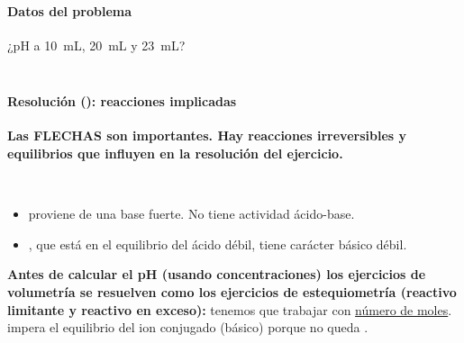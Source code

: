 
\begin{frame}
	\frametitle{\ejerciciocmd}
	\framesubtitle{Datos del problema}
	\begin{center}
		{\huge ¿$\mathrm{pH}$ a \SI{10}{\milli\liter}, \SI{20}{\milli\liter} y \SI{23}{\milli\liter}?}\\[.3cm]
		\\[.3cm]
	\end{center}
\end{frame}

\begin{frame}
	\frametitle{\ejerciciocmd}
	\framesubtitle{Resolución (): reacciones implicadas}
	\alert{\textbf{Las FLECHAS son importantes. Hay reacciones irreversibles y equilibrios que influyen en la resolución del ejercicio.}}
	\\
	\begin{center}
	\end{center}
	\\
	\begin{center}
	\end{center}
	\begin{center}
	\end{center}
	\begin{itemize}
		\item{} proviene de una base fuerte. No tiene actividad ácido-base.
		\item{}, que está en el equilibrio del ácido débil, tiene carácter básico débil.
	\end{itemize}
	\alert{\textbf{Antes de calcular el pH (usando concentraciones) los ejercicios de volumetría se resuelven como los ejercicios de estequiometría (reactivo limitante y reactivo en exceso):}} tenemos que trabajar con \underline{número de moles}.
	 impera el equilibrio del ion conjugado (básico) porque no queda .
	\begin{center}
	\end{center}
\end{frame}

